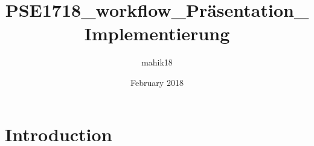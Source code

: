 \documentclass{article}
\title{PSE1718_workflow_Präsentation_Implementierung}
\author{mahik18 }
\date{February 2018}
\begin{document}
\maketitle

\section{Introduction}
\end{document}
